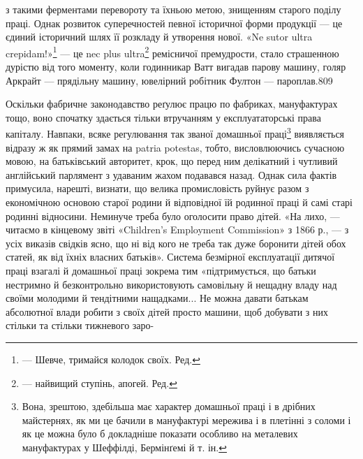 \parcont{}  %
з такими ферментами перевороту та їхньою метою, знищенням
старого поділу праці. Однак розвиток суперечностей певної історичної
форми продукції — це єдиний історичний шлях її розкладу
й утворення нової. «Ne sutor ultra crepidam!»\footnote*{
— Шевче, тримайся колодок своїх. Ред.
} — це nec plus
ultra\footnote*{
— найвищий ступінь, апогей. Ред.
} ремісничої премудрости, стало страшенною дурістю від
того моменту, коли годинникар Ватт вигадав парову машину,
голяр Аркрайт — прядільну машину, ювелірний робітник Фултон
— пароплав.809

Оскільки фабричне законодавство реґулює працю по фабриках,
мануфактурах тощо, воно спочатку здається тільки втручанням
у експлуататорські права капіталу. Навпаки, всяке регулювання
так званої домашньої праці\footnote{
Вона, зрештою, здебільша має характер домашньої праці і в
дрібних майстернях, як ми це бачили в мануфактурі мережива і в плетінні
з соломи і як це можна було б докладніше показати особливо на металевих
мануфактурах у Шеффілді, Бермінґемі й т. ін.
} виявляється відразу ж
як прямий замах на patria potestas, тобто, висловлюючись сучасною
мовою, на батьківський авторитет, крок, що перед ним делікатний
і чутливий англійський парлямент з удаваним жахом
подавався назад. Однак сила фактів примусила, нарешті, визнати,
що велика промисловість руйнує разом з економічною основою
старої родини й відповідної їй родинної праці й самі старі родинні
відносини. Неминуче треба було оголосити право дітей. «На лихо,
— читаємо в кінцевому звіті «Children’s Employment Commission»
з 1866 р., — з усіх виказів свідків ясно, що ні від кого
не треба так дуже боронити дітей обох статей, як від їхніх власних
батьків». Система безмірної експлуатації дитячої праці взагалі
й домашньої праці зокрема тим «підтримується, що батьки нестримно
й безконтрольно використовують самовільну й нещадну
владу над своїми молодими й тендітними нащадками... Не можна
давати батькам абсолютної влади робити з своїх дітей просто
машини, щоб добувати з них стільки та стільки тижневого заро-

